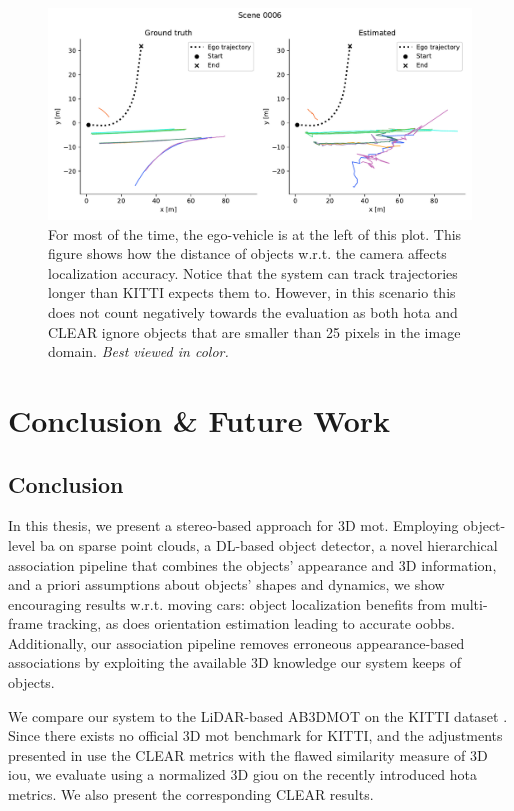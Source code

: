 \documentclass[headsepline, hidelinks, footsepline, footinclude=false, oneside, fontsize=11pt, paper=a4, listof=totoc, bibliography=totoc]{scrbook}
\begin{document}
\begin{figure}[htbp]
\centering
\includegraphics[width=\textwidth]{figures/trajs_6.pdf}
\caption{\label{fig:trajs-6}For most of the time, the ego-vehicle is at the left of this plot. This figure shows how the distance of objects w.r.t. the camera affects localization accuracy. Notice that the system can track trajectories longer than KITTI expects them to. However, in this scenario this does not count negatively towards the evaluation as both \gls{hota} and CLEAR ignore objects that are smaller than 25 pixels in the image domain. \emph{Best viewed in color.}}
\end{figure}



\chapter{Conclusion \& Future Work}
\label{sec:org32d6d7e}

\section{Conclusion}
\label{sec:org988f08c}
  In this thesis, we present a stereo-based approach for 3D \gls{mot}. 
Employing object-level \gls{ba} on sparse point clouds, a DL-based object detector, a novel hierarchical association pipeline that combines the objects' appearance and 3D information, and a priori assumptions about objects' shapes and dynamics,
we show encouraging results w.r.t. moving cars: object localization benefits from multi-frame tracking, as does orientation estimation leading to accurate \glspl{oobb}. 
Additionally, our association pipeline removes erroneous appearance-based associations by exploiting the available 3D knowledge our system keeps of objects.

We compare our system to the LiDAR-based AB3DMOT \cite{wengBaseline3DMultiObject2019} on the KITTI dataset \cite{geigerVisionMeetsRobotics2013}.
Since there exists no official 3D \gls{mot} benchmark for KITTI, and the adjustments presented in \cite{wengBaseline3DMultiObject2019} use the CLEAR \cite{bernardinEvaluatingMultipleObject2008} metrics with the flawed similarity measure of 3D \gls{iou},
we evaluate using a normalized 3D \gls{giou} on the recently introduced \gls{hota} \cite{luitenHOTAHigherOrder2021} metrics. We also present the corresponding CLEAR results.
\end{document}
